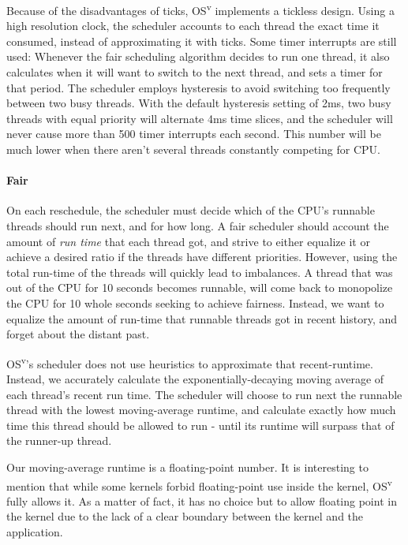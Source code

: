 \documentclass{sig-alternate}
\begin{document}
Because of the disadvantages of ticks, OS\textsuperscript{v} implements a tickless design. Using
a high resolution clock, the scheduler
accounts to each thread the exact time it consumed, instead of approximating it with ticks.
Some timer interrupts are still
used: Whenever the fair scheduling algorithm
decides to run one thread, it also calculates when it will want to switch
to the next thread, and sets a timer for that period. The scheduler employs
hysteresis to avoid switching too frequently between two busy threads.
With the default hysteresis setting of 2ms, two busy threads with equal
priority will alternate 4ms time slices, and the scheduler will never
cause more than 500 timer interrupts each second. This number will
be much lower when there aren't several threads constantly competing for CPU.

\paragraph{Fair}
\label{par:fair}
On each reschedule, the scheduler must decide which of the CPU's runnable
threads should run next, and for how long. A fair scheduler
should account the amount of \emph{run time} that each thread got, and
strive to either equalize it or achieve a desired ratio if the threads have
different priorities. However, using the total run-time of the threads
will quickly lead to imbalances. A thread that was out of the CPU for 10 seconds
becomes runnable, will come back to monopolize the CPU
for 10 whole seconds seeking to achieve fairness. Instead, we want to
equalize the amount of run-time that runnable threads got in recent
history, and forget about the distant past.

OS\textsuperscript{v}'s scheduler does not use heuristics
to approximate that recent-runtime. Instead, we accurately calculate
the exponentially-decaying moving average of each thread's recent
run time. The scheduler will choose to run next
the runnable thread with the lowest moving-average runtime, and calculate
exactly how much time this thread should be allowed to run - until its
runtime will surpass that of the runner-up thread.

Our moving-average runtime is a floating-point number. It is interesting
to mention that while some kernels forbid floating-point use inside the
kernel, OS\textsuperscript{v} fully allows it. As a matter of fact, it has no choice but to allow floating
point in the kernel due to the lack of a clear boundary between
the kernel and the application.
\end{document}
